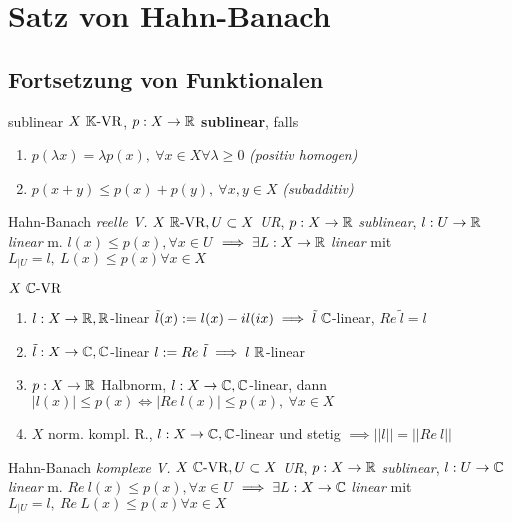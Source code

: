 \section{Satz von Hahn-Banach}


\subsection{Fortsetzung von Funktionalen}

\begin{definition}{sublinear}
  $X\ \mathbb{K} \text{-VR}$, $p:X\to\mathbb{R}$ \textbf{sublinear}, falls
  \begin{enumerate}[label = (\arabic*)]
    \item $p(\lambda x) = \lambda p(x),\
      \forall x \in X \forall \lambda \geq 0$ \textit{(positiv homogen)}
    \item $p(x+y) \leq p(x) + p(y),\ \forall x,y \in X$ \textit{(subadditiv)}
  \end{enumerate}
\end{definition}

\begin{satz}{Hahn-Banach \textit{reelle V.}}
  $X \ \mathbb{R} \text{-VR}, U \subset X$ \textit{UR}, $p:X\to \mathbb{R}$ \textit{sublinear},
  $l:U \to \mathbb{R}$ \textit{linear} m. $l(x) \leq p(x), \forall x\in U$
  $\implies \exists L:X\to \mathbb{R}$ \textit{linear} mit $L_{|U} = l,\
  L(x) \leq p(x) \forall x\in X$
\end{satz}

\begin{lemma}
  $X \ \mathbb{C} \text{-VR}$
  \begin{enumerate}[label = (\roman*)]
    \item $l:X \to \mathbb{R}, \mathbb{R}$-linear $\tilde{l}(x):=l(x) -il(ix) \implies
      \tilde{l}\ \mathbb{C}$-linear, $Re\ \tilde{l} = l$
    \item $\tilde{l}:X \to \mathbb{C}, \mathbb{C}$-linear
      $l:=Re\ \tilde{l} \implies l\ \mathbb{R}$-linear
    \item $p:X\to \mathbb{R}$ Halbnorm, $l:X\to \mathbb{C}, \mathbb{C}$-linear, dann
      $|l(x)| \leq p(x) \Leftrightarrow |Re\ l(x)| \leq p(x),\ \forall x\in X$
    \item $X$ norm. kompl. R., $l:X \to \mathbb{C}, \mathbb{C}$-linear und stetig
      $\implies ||l|| = ||Re\ l||$
  \end{enumerate}
\end{lemma}

\begin{satz}{Hahn-Banach \textit{komplexe V.}}
  $X \ \mathbb{C} \text{-VR}, U \subset X$ \textit{UR}, $p:X\to \mathbb{R}$ \textit{sublinear},
  $l:U \to \mathbb{C}$ \textit{linear} m. $Re\ l(x) \leq p(x), \forall x\in U$
  $\implies \exists L:X\to \mathbb{C}$ \textit{linear} mit $L_{|U} = l,\
  Re\ L(x) \leq p(x) \forall x\in X$
\end{satz}

